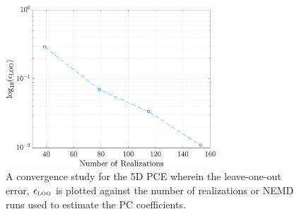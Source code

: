 \clearpage



\begin{figure}[p]
 \begin{center}
  \includegraphics[width=0.70\textwidth]{./Figures/PCE5D_eloo}
\caption{A convergence study for the 5D PCE wherein the leave-one-out
error, $\epsilon_{\tiny{\mbox{LOO}}}$ is plotted against the number of
realizations or NEMD runs used to estimate the PC coefficients.}
\label{fig:loo}
\end{center}
\end{figure}

\clearpage




